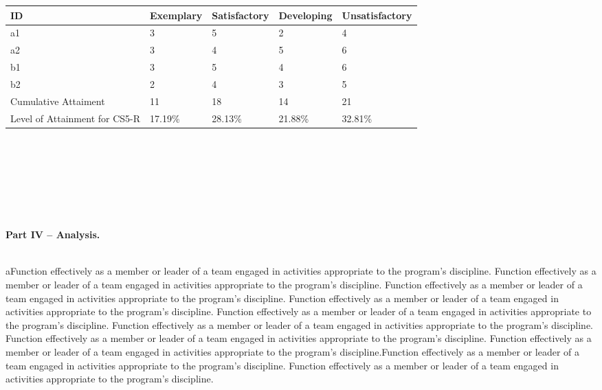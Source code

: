 \documentclass{article}
\begin{document}
\begin{tabular}{|p{}|p{}|p{}|p{}|p{}|}\hline
ID & Exemplary & Satisfactory & Developing & Unsatisfactory \\ \hline
a1 & 3 & 5 & 2 & 4 \\ \hline
a2 & 3 & 4 & 5 & 6 \\ \hline
b1 & 3 & 5 & 4 & 6 \\ \hline
b2 & 2 & 4 & 3 & 5 \\ \hline
Cumulative Attaiment & 11 & 18 & 14 & 21 \\ \hline
Level of Attainment for CS5-R & 17.19\% & 28.13\% & 21.88\% & 32.81\% \\ \hline
\end{tabular} \\
\\
\\

     \\
\\
\\
\textbf{Part IV – Analysis.} \\
\\
\parbox{\textwidth}{\raggedright aFunction effectively as a member or leader of a team engaged in activities appropriate to the program’s discipline. Function effectively as a member or leader of a team engaged in activities appropriate to the program’s discipline. Function effectively as a member or leader of a team engaged in activities appropriate to the program’s discipline. Function effectively as a member or leader of a team engaged in activities appropriate to the program’s discipline. Function effectively as a member or leader of a team engaged in activities appropriate to the program’s discipline. Function effectively as a member or leader of a team engaged in activities appropriate to the program’s discipline. Function effectively as a member or leader of a team engaged in activities appropriate to the program’s discipline. Function effectively as a member or leader of a team engaged in activities appropriate to the program’s discipline.Function effectively as a member or leader of a team engaged in activities appropriate to the program’s discipline. Function effectively as a member or leader of a team engaged in activities appropriate to the program’s discipline.}
\end{document}
